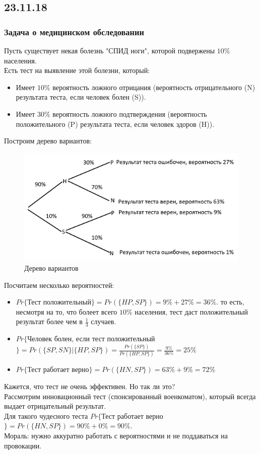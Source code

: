 \subsection{23.11.18}
\subsubsection{Задача о медицинском обследовании}
Пусть существует некая болезнь "СПИД ноги", которой подвержены $10\%$ населения. \\
Есть тест на выявление этой болезни, который: \\
\begin{itemize}
\item Имеет $10\%$ вероятность ложного отрицания (вероятность отрицательного (N) результата теста, если человек болен (S)).\\
\item Имеет $30\%$ вероятность ложного подтверждения (вероятность положительного (P) результата теста, если человек здоров (H)).\\
\end{itemize}
Построим дерево вариантов:\\
\begin{figure}
\includegraphics[width=\linewidth]{Medicare.png}
\caption{Дерево вариантов}
\label{fig:Medicare}
\end{figure}
Посчитаем несколько вероятностей:\\
\begin{itemize}
\item $Pr\{$Тест положительный$\} = Pr(\{HP, SP\}) = 9\% + 27\% = 36\%$. то есть, несмотря на то, что болеет всего $10\%$ населения, тест даст положительный результат более чем в $\frac{1}{3}$ случаев.\\
\item $Pr\{$Человек болен, если тест положительный$\} = Pr(\{SP, SN\}|\{HP, SP\}) = \frac{Pr(\{SP\})}{Pr(\{HP, SP\})} = \frac{9\%}{36\%} = 25\%$\\
\item $Pr\{$Тест работает верно$\} = Pr(\{HN, SP\}) = 63\% + 9\% = 72\%$
\end{itemize}
Кажется, что тест не очень эффективен. Но так ли это?\\
Рассмотрим инновационный тест (спонсированный военкоматом), который всегда выдает отрицательный результат.\\
Для такого чудесного теста $Pr\{$Тест работает верно$\} = Pr(\{HN, SP\}) = 90\% + 0\% = 90\%$.\\
Мораль: нужно аккуратно работать с вероятностями и не поддаваться на провокации.
